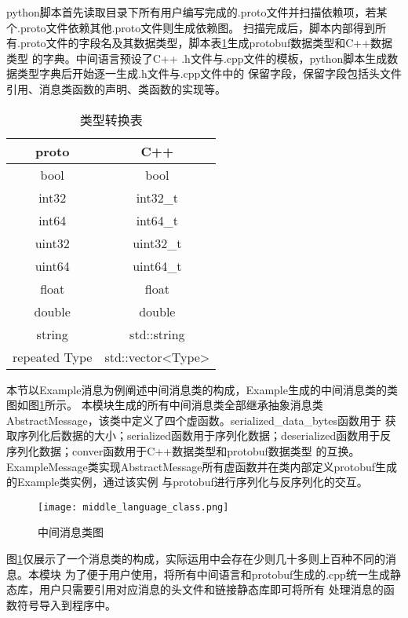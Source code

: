 python脚本首先读取目录下所有用户编写完成的.proto文件并扫描依赖项，若某个.proto文件依赖其他.proto文件则生成依赖图。
扫描完成后，脚本内部得到所有.proto文件的字段名及其数据类型，脚本表\ref{type_convert}生成protobuf数据类型和C++数据类型
的字典。中间语言预设了C++ .h文件与.cpp文件的模板，python脚本生成数据类型字典后开始逐一生成.h文件与.cpp文件中的
保留字段，保留字段包括头文件引用、消息类函数的声明、类函数的实现等。
\begin{table}[htb]
  \centering\small
  \caption{类型转换表}
  \label{type_convert}
  \begin{tabular}{cc}
    \toprule
    proto & C++ \\
    \midrule
    bool & bool \\
    int32 & int32\_t \\
    int64 & int64\_t \\
    uint32 & uint32\_t \\ 
    uint64 & uint64\_t \\
    float & float \\
    double & double \\
    string & std::string \\
    repeated Type & std::vector<Type>\\
    \bottomrule
  \end{tabular}
\end{table}

本节以Example消息为例阐述中间消息类的构成，Example生成的中间消息类的类图如图\ref{middle_language_class}所示。
本模块生成的所有中间消息类全部继承抽象消息类AbstractMessage，该类中定义了四个虚函数。serialized\_data\_bytes函数用于
获取序列化后数据的大小；serialized函数用于序列化数据；deserialized函数用于反序列化数据；conver函数用于C++数据类型和protobuf数据类型
的互换。ExampleMessage类实现AbstractMessage所有虚函数并在类内部定义protobuf生成的Example类实例，通过该实例
与protobuf进行序列化与反序列化的交互。
\begin{figure}[H]
  \centering
  \texttt{[image: middle\_language\_class.png]}
  \caption{中间消息类图}
  \label{middle_language_class}
\end{figure}
图\ref{middle_language_class}仅展示了一个消息类的构成，实际运用中会存在少则几十多则上百种不同的消息。本模块
为了便于用户使用，将所有中间语言和protobuf生成的.cpp统一生成静态库，用户只需要引用对应消息的头文件和链接静态库即可将所有
处理消息的函数符号导入到程序中。













